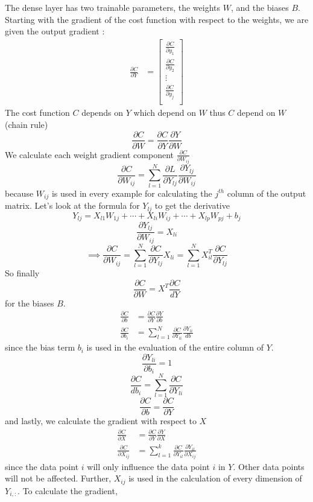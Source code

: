 \documentclass[a4paper, twocolumn, twoside]{article}
\begin{document}
	The dense layer has two trainable parameters, the weights $W$, and the biases $B$.
	Starting with the gradient of the cost function with respect to the weights, we are given
	the output gradient :
	\begin{align}
		\frac{\partial C}{\partial Y} &= \begin{bmatrix}
		\frac{\partial C}{\partial y_1} \\
		\frac{\partial C}{\partial y_2} \\
        \vdots \\
	   \frac{\partial C}{\partial y_j} \\
	\end{bmatrix}
	\end{align}
	The cost function $C$ depends on $Y$ which depend on $W$ thus $C$ depend on $W$ (chain rule)
	$$
    \frac{\partial C}{\partial W} = \frac{\partial C}{\partial Y} \frac{\partial Y}{\partial W}
	$$
	We calculate each weight gradient component $\frac{\partial C }{\partial W_{ij}}$
	$$
    \frac{\partial C}{\partial W_{ij}} = \sum_{l=1}^{N} \frac{\partial L}{\partial Y_{lj}} \frac{\partial Y_{lj}}{\partial W_{ij}}
	$$
	because $W_{ij}$ is used in every example for calculating the $j^{th}$ column of the output matrix. Let's look at the formula for $Y_{lj}$ to get the derivative
	$$
		Y_{lj} = X_{l1}W_{1j} + \cdots + X_{li}W_{ij} + \cdots + X_{lp}W_{pj} + b_{j}
	$$
	$$
		\frac{\partial Y_{lj}}{\partial W_{ij}} = X_{li}
	$$
	$$
		\implies \frac{\partial C}{\partial W_{ij}} = \sum_{l=1}^{N} \frac{\partial C}{\partial Y_{lj}} X_{li} = \sum_{l=1}^{N} X^{T}_{il}\frac{\partial C}{\partial Y_{lj}}
	$$
	So finally 
	$$
		\frac{\partial C}{\partial W} = X^{T} \frac{\partial C}{dY}
	$$
	for the biases $B$.
	\begin{align}
		\frac{\partial C}{\partial b} &= \frac{\partial C}{\partial Y} \frac{\partial Y}{\partial b}\\
		\frac{\partial C}{\partial b_{i}} &= \sum_{l=1}^{N} \frac{\partial C}{\partial Y_{li}} \frac{\partial Y_{li}}{db}
	\end{align}
	since the bias term $b_{i}$ is used in the evaluation of the entire column of $Y$.
	$$
		\frac{\partial Y_{li}}{\partial b_{i}} = 1
	$$
	$$
		\frac{\partial C}{db_{i}} = \sum_{l=1}^{N} \frac{\partial C}{\partial Y_{li}}
	$$
	$$
		\frac{\partial C}{\partial b} = \frac{\partial C}{\partial Y}
	$$
	and lastly, we calculate the gradient with respect to $X$
	\begin{align}
		\frac{\partial C}{\partial X} &= \frac{\partial C}{\partial Y} \frac{\partial Y}{\partial X}\\
		\frac{\partial C}{\partial X_{ij}} &= \sum_{l=1}^{k} \frac{\partial C}{\partial Y_{il}} \frac{\partial Y_{il}}{\partial X_{ij}}
	\end{align}
	since the data point $i$ will only influence the data point $i$ in $Y$. Other data points will not be affected. Further, $X_{ij}$ is used in the calculation of every dimension of $Y_{i,:}$. To calculate the gradient,
\end{document}
